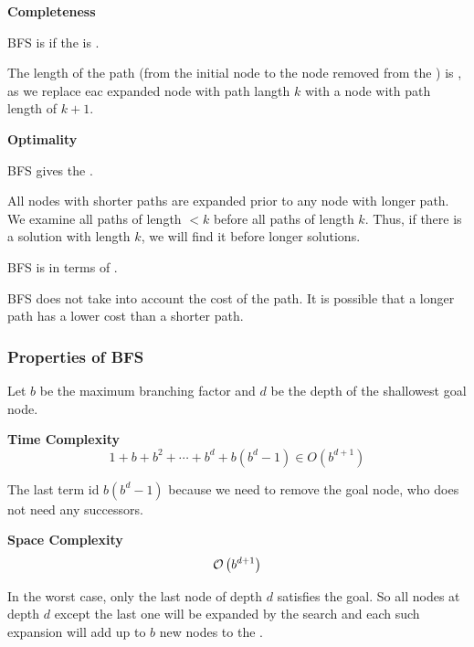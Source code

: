 \begin{listu}
    \item \textbf{Completeness}

    \begin{listu}
        \item BFS is  if the  is .
        \item The length of the path (from the initial node to the node removed from the \Frontier) is , as we replace eac expanded node with path langth $k$ with a node with path length of $k + 1$.
    \end{listu}

    \item \textbf{Optimality}

    \begin{listu}
        \item BFS gives the .

        All nodes with shorter paths are expanded prior to any node with longer path. We examine all paths of length $< k$ before all paths of length $k$. Thus, if there is a solution with length $k$, we will find it before longer solutions.

        \item BFS is  in terms of .

        BFS does not take into account the cost of the path. It is possible that a longer path has a lower cost than a shorter path.
    \end{listu}
\end{listu}


\subsubsection{Properties of BFS}

Let $b$ be the maximum branching factor and $d$ be the depth of the shallowest goal node.

\begin{listu}
    \item \textbf{Time Complexity} \[
        1 + b + b^2 + \cdots + b^d + b(b^d - 1) \in O(b^{d+1})
    \]

    The last term id $b(b^d - 1)$ because we need to remove the goal node, who does not need any successors.

    \item \textbf{Space Complexity} \[
        \mathcal{O}\left(b^{d+1}\right)
    \]

    In the worst case, only the last node of depth $d$ satisfies the goal. So all nodes at depth $d$ except the last one will be expanded by the search and each such expansion will add up to $b$ new nodes to the \Frontier.
\end{listu}


